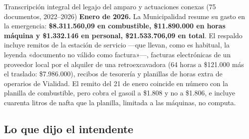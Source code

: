 \begin{ficha}{Transcripción integral del legajo del amparo y actuaciones conexas (75 documentos, 2022--2026)}
\textbf{Enero de 2026.} La Municipalidad resume su gasto en la emergencia: \textbf{\$8.311.560,09 en combustible, \$11.890.000 en horas máquina y \$1.332.146 en personal, \$21.533.706,09 en total}. El respaldo incluye remitos de la estación de servicio ---que llevan, como es habitual, la leyenda «documento no válido como factura»---, facturas electrónicas de un proveedor local por el alquiler de una retroexcavadora (64 horas a \$121.000 más el traslado: \$7.986.000), recibos de tesorería y planillas de horas extra de operarios de Vialidad. El remito del 21 de enero coincide en número con la planilla de combustible, pero cobra el gasoil a \$1.808 y no a \$1.806, e incluye cuarenta litros de nafta que la planilla, limitada a las máquinas, no computa.
\end{ficha}

\subsection*{Lo que dijo el intendente}

